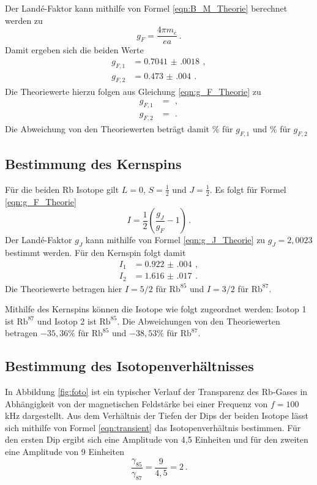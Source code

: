 Der Landé-Faktor kann mithilfe von Formel \eqref{eqn:B_M_Theorie} berechnet werden zu
\begin{equation*}
  g_F=\frac{4\pi m_e}{e a} \,.
\end{equation*}
Damit ergeben sich die beiden Werte
\begin{align*}
  g_{F,1}&= \SI{0.7041(0018)}{}\,,\\
  g_{F,2}&= \SI{0.473(004)}{}\,.
\end{align*}
Die Theoriewerte hierzu folgen aus Gleichung \eqref{eqn:g_F_Theorie} zu
\begin{align*}
  g_{F,1}&= \SI{}{}\,,\\
  g_{F,2}&= \SI{}{}\,.
\end{align*}
Die Abweichung von den Theoriewerten beträgt damit $\%$ für $g_{F,1}$ und
 $\%$ für $g_{F,2}$

\subsection{Bestimmung des Kernspins}
\label{subsec:Kernspin}

Für die beiden Rb Isotope gilt $L=0$, $S=\frac{1}{2}$ und $J=\frac{1}{2}$.
Es folgt für Formel \eqref{eqn:g_F_Theorie}
\begin{equation*}
  I=\frac{1}{2}\left(\frac{g_J}{g_F}-1\right) \,.
\end{equation*}
Der Landé-Faktor $g_J$ kann mithilfe von Formel \ref{eqn:g_J_Theorie} zu $g_J=2{,}0023$ bestimmt
werden. Für den Kernspin folgt damit
\begin{align*}
  I_1&= \SI{0.922(004)}{}\,,\\
  I_2&= \SI{1.616(017)}{}\,.
\end{align*}
Die Theoriewerte betragen hier $I=5/2$ für $\text{Rb}^{85}$ und $I=3/2$ für $\text{Rb}^{87}$.

Mithilfe des Kernspins können die Isotope wie folgt zugeordnet werden: Isotop 1 ist $\text{Rb}^{87}$
und Isotop 2 ist $\text{Rb}^{85}$. Die Abweichungen von den Theoriewerten betragen
$-35{,}36\%$ für $\text{Rb}^{85}$ und $-38{,}53\%$ für $\text{Rb}^{87}$.


\subsection{Bestimmung des Isotopenverhältnisses}
\label{subsec:Isotope}
In Abbildung \ref{fig:foto} ist ein typischer Verlauf der Transparenz des Rb-Gases in Abhängigkeit
von der magnetischen Feldstärke bei einer Frequenz von $f=100\,$kHz dargestellt.
Aus dem Verhältnis der Tiefen der Dips der beiden
Isotope lässt sich mithilfe von Formel \ref{eqn:transient} das Isotopenverhältnis bestimmen.
Für den ersten Dip ergibt sich eine Amplitude von 4{,}5 Einheiten und für den zweiten
eine Amplitude von 9 Einheiten
\begin{equation}
  \frac{\gamma_{85}}{\gamma_{87}}=\frac{9}{4{,}5}= 2 \,.
\end{equation}

